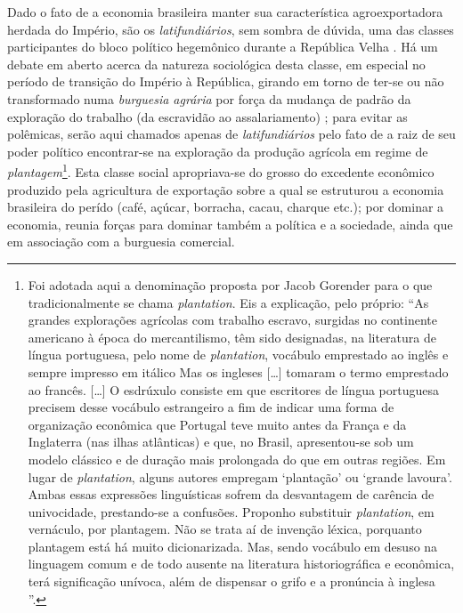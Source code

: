 Dado o fato de a economia brasileira manter sua característica agroexportadora herdada do Império, são os \textit{latifundiários}, sem sombra de dúvida, uma das classes participantes do bloco político hegemônico durante a República Velha \cite{gorender_burguesia_1990,oliveira_emopro_1977,CARONE1970inst}. Há um debate em aberto acerca da natureza sociológica desta classe, em especial no período de transição do Império à República, girando em torno de ter-se ou não transformado numa \textit{burguesia agrária} por força da mudança de padrão da exploração do trabalho (da escravidão ao assalariamento) \cite{gorender_burguesia_1990,oliveira_emopro_1977}; para evitar as polêmicas, serão aqui chamados apenas de \textit{latifundiários} pelo fato de a raiz de seu poder político encontrar-se na exploração da produção agrícola em regime de \textit{plantagem}\footnote{Foi adotada aqui a denominação proposta por Jacob Gorender para o que tradicionalmente se chama \textit{plantation}. Eis a explicação, pelo próprio: ``As grandes explorações agrícolas com trabalho escravo, surgidas no continente americano à época do mercantilismo, têm sido designadas, na literatura de língua portuguesa, pelo nome de \textit{plantation}, vocábulo emprestado ao inglês e sempre impresso em itálico Mas os ingleses [\dots] tomaram o termo emprestado ao francês. [\dots] O esdrúxulo consiste em que escritores de língua portuguesa precisem desse vocábulo estrangeiro a fim de indicar uma forma de organização econômica que Portugal teve muito antes da França e da Inglaterra (nas ilhas atlânticas) e que, no Brasil, apresentou-se sob um modelo clássico e de duração mais prolongada do que em outras regiões. Em lugar de \textit{plantation}, alguns autores empregam `plantação' ou `grande lavoura'. Ambas essas expressões linguísticas sofrem da desvantagem de carência de univocidade, prestando-se a confusões. Proponho substituir \textit{plantation}, em vernáculo, por plantagem. Não se trata aí de invenção léxica, porquanto plantagem está há muito dicionarizada. Mas, sendo vocábulo em desuso na linguagem comum e de todo ausente na literatura historiográfica e econômica, terá significação unívoca, além de dispensar o grifo e a pronúncia à inglesa \cite[pp.~119-120]{gorender_escracolo_2010}''.}. Esta classe social apropriava-se do grosso do excedente econômico produzido pela agricultura de exportação sobre a qual se estruturou a economia brasileira do perído (café, açúcar, borracha, cacau, charque etc.); por dominar a economia, reunia forças para dominar também a política e a sociedade, ainda que em associação com a burguesia comercial.

